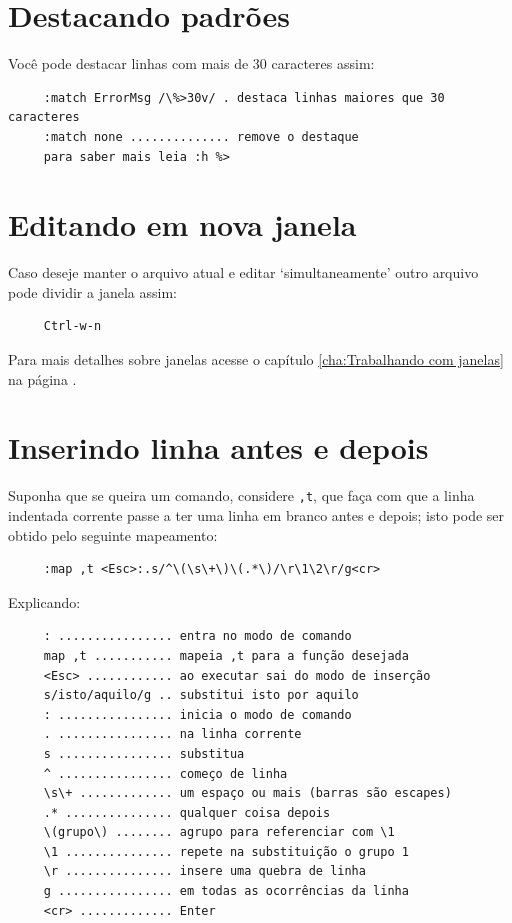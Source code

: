 \documentclass[10pt,a4paper,openany]{book}
\begin{document}
\section{Destacando padrões}\label{sec:Destacando padrões}

Você pode destacar linhas com mais de 30 caracteres assim:

\begin{verbatim}
     :match ErrorMsg /\%>30v/ . destaca linhas maiores que 30 caracteres
     :match none .............. remove o destaque
     para saber mais leia :h %>
\end{verbatim}


\section{Editando em nova janela}\label{Editando em nova janela}

Caso deseje manter o arquivo atual e editar `simultaneamente' outro arquivo
pode dividir a janela assim:

\begin{verbatim}
     Ctrl-w-n
\end{verbatim}

Para mais detalhes sobre janelas acesse o capítulo
\ref{cha:Trabalhando com janelas} na página \pageref{cha:Trabalhando
com janelas}.


\section{Inserindo linha antes e depois}

Suponha que se queira um comando, considere \verb|,t|, que faça com que a
linha indentada corrente passe a ter uma linha em branco antes e depois; isto
pode ser obtido pelo seguinte mapeamento:

\begin{verbatim}
     :map ,t <Esc>:.s/^\(\s\+\)\(.*\)/\r\1\2\r/g<cr>
\end{verbatim}
     
Explicando:
     
\begin{verbatim}
     : ................ entra no modo de comando
     map ,t ........... mapeia ,t para a função desejada
     <Esc> ............ ao executar sai do modo de inserção
     s/isto/aquilo/g .. substitui isto por aquilo
     : ................ inicia o modo de comando
     . ................ na linha corrente
     s ................ substitua
     ^ ................ começo de linha
     \s\+ ............. um espaço ou mais (barras são escapes)
     .* ............... qualquer coisa depois
     \(grupo\) ........ agrupo para referenciar com \1
     \1 ............... repete na substituição o grupo 1
     \r ............... insere uma quebra de linha
     g ................ em todas as ocorrências da linha
     <cr> ............. Enter
\end{verbatim}
\end{document}
